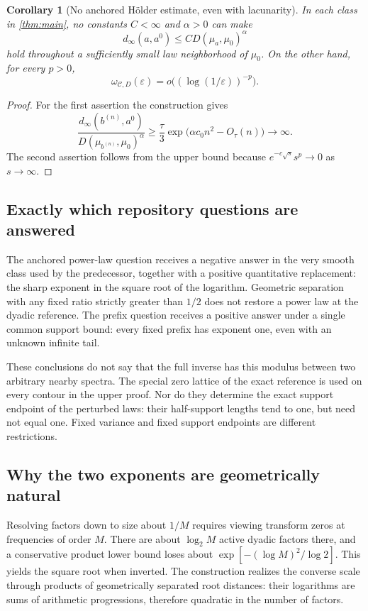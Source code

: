 \documentclass[11pt,a4paper]{article}
\numberwithin{equation}{section}
\newtheorem{corollary}[theorem]{Corollary}
\theoremstyle{definition}
\theoremstyle{remark}
\newcommand{\eps}{\varepsilon}
\begin{document}
\begin{corollary}[No anchored H\"older estimate, even with lacunarity]
\label{cor:no-holder}
In each class in \cref{thm:main}, no constants $C<\infty$ and $\alpha>0$
can make
\[
 d_\infty(a,a^0)\le C D(\mu_a,\mu_0)^\alpha
\]
hold throughout a sufficiently small law neighborhood of $\mu_0$.
On the other hand, for every $p>0$,
\[
 \omega_{\mathcal C,D}(\eps)=o\bigl((\log(1/\eps))^{-p}\bigr).
\]
\end{corollary}
\begin{proof}
For the first assertion the construction gives
\[
 \frac{d_\infty(b^{(n)},a^0)}{D(\mu_{b^{(n)}},\mu_0)^\alpha}
 \ge\frac\tau3\exp\bigl(\alpha c_0n^2-O_\tau(n)\bigr)\longrightarrow\infty.
\]
The second assertion follows from the upper bound because
$e^{-c\sqrt{s}}s^p\to0$ as $s\to\infty$.
\end{proof}

\subsection{Exactly which repository questions are answered}

The anchored power-law question receives a negative answer in the very smooth
class used by the predecessor, together with a positive quantitative replacement:
the sharp exponent in the square root of the logarithm. Geometric separation
with any fixed ratio strictly greater than $1/2$ does not restore a power law
at the dyadic reference. The prefix question receives a positive answer under
a single common support bound: every fixed prefix has exponent one, even with
an unknown infinite tail.

These conclusions do not say that the full inverse has this modulus between
two arbitrary nearby spectra. The special zero lattice of the exact reference
is used on every contour in the upper proof. Nor do they determine the exact
support endpoint of the perturbed laws: their half-support lengths tend to
one, but need not equal one. Fixed variance and fixed support endpoints are
different restrictions.

\subsection{Why the two exponents are geometrically natural}

Resolving factors down to size about $1/M$ requires viewing transform zeros
at frequencies of order $M$. There are about $\log_2 M$ active dyadic
factors there, and a conservative product lower bound loses about
$\exp[-(\log M)^2/\log2]$. This yields the square root when inverted.
The construction realizes the converse scale through products of geometrically
separated root distances: their logarithms are sums of arithmetic progressions,
therefore quadratic in the number of factors.
\end{document}
